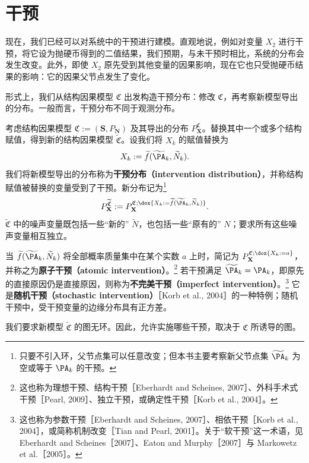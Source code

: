 \section{干预}
\label{sec:ch06-interventions}

现在，我们已经可以对系统中的干预进行建模。直观地说，例如对变量 $X_2$ 进行干预，将它设为抛硬币得到的二值结果，我们预期，与未干预时相比，系统的分布会发生改变。此外，即使 $X_2$ 原先受到其他变量的因果影响，现在它也只受抛硬币结果的影响：它的因果父节点发生了变化。

形式上，我们从结构因果模型 $\mathfrak C$ 出发构造干预分布：修改 $\mathfrak C$，再考察新模型导出的分布。一般而言，干预分布不同于观测分布。

\begin{definition}[干预分布]
考虑结构因果模型 $\mathfrak C:=(\mathbf S,P_{\mathbf N})$ 及其导出的分布 $P_{\mathbf X}^{\mathfrak C}$。替换其中一个或多个结构赋值，得到新的结构因果模型 $\widetilde{\mathfrak C}$。设我们将 $X_k$ 的赋值替换为
\[
 X_k:=\widetilde f(\widetilde{\PA}_k,\widetilde N_k).
\]
我们将新模型导出的分布称为\textbf{干预分布（intervention distribution）}，并称结构赋值被替换的变量受到了干预。新分布记为\footnote{只要不引入环，父节点集可以任意改变；但本书主要考察新父节点集 $\widetilde{\PA}_k$ 为空或等于 $\PA_k$ 的干预。}
\[
 P_{\mathbf X}^{\widetilde{\mathfrak C}}
 :=P_{\mathbf X}^{\mathfrak C;\dox{X_k:=\widetilde f(\widetilde{\PA}_k,\widetilde N_k)}}.
\]
$\widetilde{\mathfrak C}$ 中的噪声变量既包括一些“新的” $\widetilde N$，也包括一些“原有的” $N$；要求所有这些噪声变量相互独立。

当 $\widetilde f(\widetilde{\PA}_k,\widetilde N_k)$ 将全部概率质量集中在某个实数 $a$ 上时，简记为 $P_{\mathbf X}^{\mathfrak C;\dox{X_k:=a}}$，并称之为\textbf{原子干预（atomic intervention）}。\footnote{这也称为理想干预、结构干预［Eberhardt and Scheines, 2007］、外科手术式干预［Pearl, 2009］、独立干预，或确定性干预［Korb et al., 2004］。}
若干预满足 $\widetilde{\PA}_k=\PA_k$，即原先的直接原因仍是直接原因，则称为\textbf{不完美干预（imperfect intervention）}。\footnote{这也称为参数干预［Eberhardt and Scheines, 2007］、相依干预［Korb et al., 2004］，或简称机制改变［Tian and Pearl, 2001］。关于“软干预”这一术语，见 Eberhardt and Scheines［2007］、Eaton and Murphy［2007］与 Markowetz et al.［2005］。}
它是\textbf{随机干预（stochastic intervention）}［Korb et al., 2004］的一种特例；随机干预中，受干预变量的边缘分布具有正方差。

我们要求新模型 $\widetilde{\mathfrak C}$ 的图无环。因此，允许实施哪些干预，取决于 $\mathfrak C$ 所诱导的图。
\end{definition}

